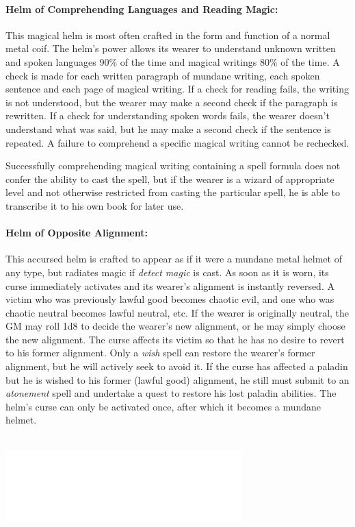 \begin{multicols}{2}
\paragraph{Helm of Comprehending Languages and Reading Magic:} This magical helm is most often crafted in the form and function of a normal metal coif.  The helm's power allows its wearer to understand unknown written and spoken languages 90\% of the time and magical writings 80\% of the time.  A check is made for each written paragraph of mundane writing, each spoken sentence and each page of magical writing.  If a check for reading fails, the writing is not understood, but the wearer may make a second check if the paragraph is rewritten.  If a check for understanding spoken words fails, the wearer doesn't understand what was said, but he may make a second check if the sentence is repeated.  A failure to comprehend a specific magical writing cannot be rechecked.  

Successfully comprehending magical writing containing a spell formula does not confer the ability to cast the spell, but if the wearer is a wizard of appropriate level and not otherwise restricted from casting the particular spell, he is able to transcribe it to his own book for later use.

\paragraph{Helm of Opposite Alignment:} This accursed helm is crafted to appear as if it were a mundane metal helmet of any type, but radiates magic if \textit{detect magic} is cast.  As soon as it is worn, its curse immediately activates and its wearer's alignment is instantly reversed.  A victim who was previously lawful good becomes chaotic evil, and one who was chaotic neutral becomes lawful neutral, etc.  If the wearer is originally neutral, the GM may roll 1d8 to decide the wearer's new alignment, or he may simply choose the new alignment.  The curse affects its victim so that he has no desire to revert to his former alignment.  Only a \textit{wish} spell can restore the wearer's former alignment, but he will actively seek to avoid it.  If the curse has affected a paladin but he is wished to his former (lawful good) alignment, he still must submit to an \textit{atonement} spell and undertake a quest to restore his lost paladin abilities.  The helm's curse can only be activated once, after which it becomes a mundane helmet.   

\noindent\includegraphics[width=3.6in, height=1.5in]{testblock.pdf}


\end{multicols}

